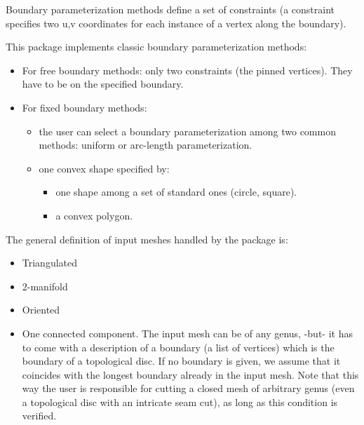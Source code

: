 
Boundary parameterization methods define a
set of constraints (a constraint specifies two u,v coordinates for
each instance of a vertex along the boundary).

This package implements classic boundary parameterization methods:
\begin{itemize}

\item For free boundary methods: only two constraints (the pinned
vertices). They have to be on the specified boundary.

\item For fixed boundary methods:

    \begin{itemize}

    \item the user can select a boundary
        parameterization among two common methods: uniform or
        arc-length parameterization.

    \item one convex shape specified by:

        \begin{itemize}

        \item one shape among a set of standard ones (circle, square).

        \item a convex polygon.

        \end{itemize}

    \end{itemize}

\end{itemize}



The general definition of input meshes handled by the package is:

\begin{itemize}

\item Triangulated

\item 2-manifold

\item Oriented

\item One connected component. The input mesh can be of any genus,
-but- it has to come with a description of a boundary (a list of
vertices) which is the boundary of
a topological disc. If no boundary is given, we assume that it
coincides with the longest boundary already in the input mesh.  Note
that this way the user is responsible for cutting a closed mesh of
arbitrary genus (even a topological disc with an intricate seam
cut), as long as this condition is verified.

\end{itemize}


